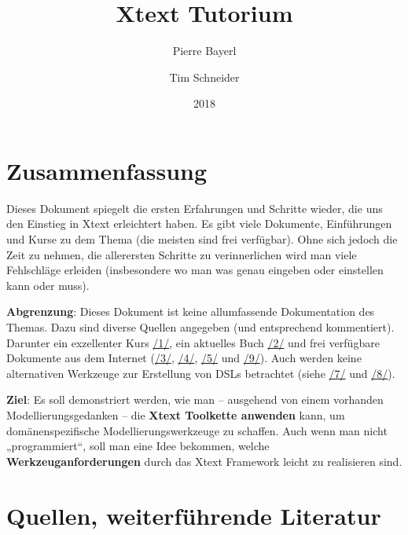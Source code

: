 \documentclass[a4]{article}
\date{}
\title{Xtext Tutorium}
\date{2018}
\author{Pierre Bayerl
\and Tim Schneider}
\begin{document}
\maketitle
\tableofcontents

\section[Zusammenfassung]{\texorpdfstring{\protect\hypertarget{anchor}{}{}Zusammenfassung}{Zusammenfassung}}\label{zusammenfassung}

Dieses Dokument spiegelt die ersten Erfahrungen und Schritte wieder, die
uns den Einstieg in Xtext erleichtert haben. Es gibt viele Dokumente,
Einführungen und Kurse zu dem Thema (die meisten sind frei verfügbar).
Ohne sich jedoch die Zeit zu nehmen, die allerersten Schritte zu
verinnerlichen wird man viele Fehlschläge erleiden (insbesondere wo man
was genau eingeben oder einstellen kann oder muss).

\textbf{Abgrenzung}: Dieses Dokument ist keine allumfassende
Dokumentation des Themas. Dazu sind diverse Quellen angegeben (und
entsprechend kommentiert). Darunter ein exzellenter Kurs
\protect\hyperlink{anchor-1}{/1/}, ein aktuelles Buch
\protect\hyperlink{anchor-2}{/2/} und frei verfügbare Dokumente aus dem
Internet (\protect\hyperlink{anchor-3}{/3/},
\protect\hyperlink{anchor-4}{/4/}, \protect\hyperlink{anchor-5}{/5/} und
\protect\hyperlink{anchor-6}{/9/}). Auch werden keine alternativen
Werkzeuge zur Erstellung von DSLs betrachtet (siehe
\protect\hyperlink{anchor-7}{/7/} und
\protect\hyperlink{anchor-8}{/8/}).

\textbf{Ziel}: Es soll demonstriert werden, wie man -- ausgehend von
einem vorhanden Modellierungsgedanken -- die \textbf{Xtext Toolkette
anwenden }kann, um domänenspezifische Modellierungswerkzeuge zu
schaffen. Auch wenn man nicht „programmiert``, soll man eine Idee
bekommen, welche \textbf{Werkzeuganforderungen }durch das Xtext
Framework leicht zu realisieren sind.

\section[Quellen, weiterführende
Literatur]{\texorpdfstring{\protect\hypertarget{anchor-9}{}{}\protect\hypertarget{anchor-10}{}{}Quellen,
weiterführende
Literatur}{Quellen, weiterführende Literatur}}\label{quellen-weiterfuxfchrende-literatur}
\end{document}

